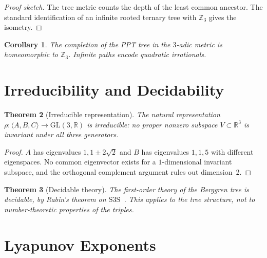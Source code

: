 \documentclass[12pt]{amsart}
\newtheorem{theorem}{Theorem}[section]
\newtheorem{corollary}[theorem]{Corollary}
\theoremstyle{definition}
\theoremstyle{remark}
\begin{document}
\begin{proof}[Proof sketch]
The tree metric counts the depth of the least common ancestor. The standard
identification of an infinite rooted ternary tree with $\mathbb{Z}_3$ gives
the isometry.
\end{proof}

\begin{corollary}
The completion of the PPT tree in the $3$-adic metric is homeomorphic to
$\mathbb{Z}_3$. Infinite paths encode quadratic irrationals.
\end{corollary}


\section{Irreducibility and Decidability}\label{sec:irred}

\begin{theorem}[Irreducible representation]\label{thm:irreducible}
The natural representation $\rho : \langle A, B, C \rangle \to \mathrm{GL}(3, \mathbb{R})$
is irreducible: no proper nonzero subspace $V \subset \mathbb{R}^3$ is
invariant under all three generators.
\end{theorem}

\begin{proof}
$A$ has eigenvalues $1, 1 \pm 2\sqrt{2}$ and $B$ has eigenvalues $1, 1, 5$
with different eigenspaces. No common eigenvector exists for a $1$-dimensional
invariant subspace, and the orthogonal complement argument rules out
dimension~2.
\end{proof}

\begin{theorem}[Decidable theory]\label{thm:decidable}
The first-order theory of the Berggren tree is decidable, by Rabin's
theorem on $\mathrm{S3S}$~\cite{Rabin1969}. This applies to the tree
structure, not to number-theoretic properties of the triples.
\end{theorem}


\section{Lyapunov Exponents}\label{sec:lyapunov}
\end{document}
